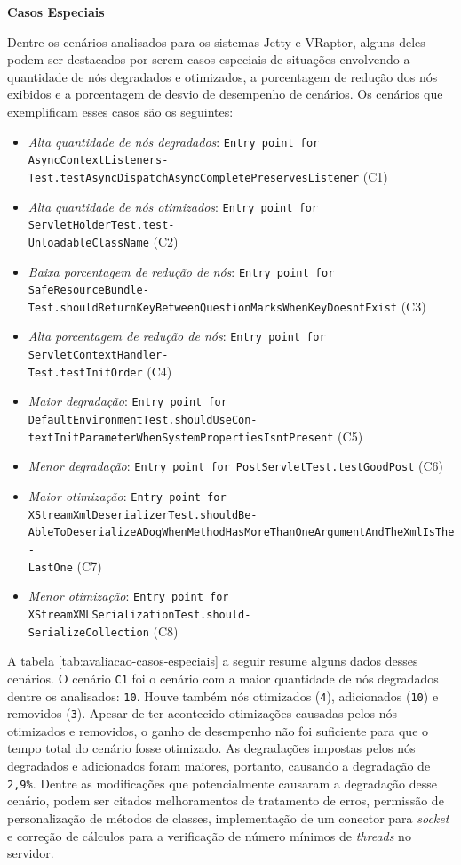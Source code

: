 \noindent \textbf{Casos Especiais}

Dentre os cenários analisados para os sistemas Jetty e VRaptor, alguns deles podem ser destacados por serem casos especiais de situações envolvendo a quantidade de nós degradados e otimizados, a porcentagem de redução dos nós exibidos e a porcentagem de desvio de desempenho de cenários. Os cenários que exemplificam esses casos são os seguintes:
\begin{itemize}
  \item \textit{Alta quantidade de nós degradados}: \texttt{Entry point for AsyncContextListeners-\\Test.testAsyncDispatchAsyncCompletePreservesListener} (C1)
  \item \textit{Alta quantidade de nós otimizados}:  \texttt{Entry point for ServletHolderTest.test-\\UnloadableClassName} (C2)
  \item \textit{Baixa porcentagem de redução de nós}: \texttt{Entry point for SafeResourceBundle-\\Test.shouldReturnKeyBetweenQuestionMarksWhenKeyDoesntExist} (C3)
  \item \textit{Alta porcentagem de redução de nós}: \texttt{Entry point for ServletContextHandler-\\Test.testInitOrder} (C4)
  \item \textit{Maior degradação}: \texttt{Entry point for DefaultEnvironmentTest.shouldUseCon-\\textInitParameterWhenSystemPropertiesIsntPresent} (C5)
  \item \textit{Menor degradação}: \texttt{Entry point for PostServletTest.testGoodPost} (C6)
  \item \textit{Maior otimização}: \texttt{Entry point for XStreamXmlDeserializerTest.shouldBe-\\AbleToDeserializeADogWhenMethodHasMoreThanOneArgumentAndTheXmlIsThe-\\LastOne} (C7)
  \item \textit{Menor otimização}: \texttt{Entry point for XStreamXMLSerializationTest.should-\\SerializeCollection} (C8)
\end{itemize}

A tabela \ref{tab:avaliacao-casos-especiais} a seguir resume alguns dados desses cenários. O cenário \texttt{C1} foi o cenário com a maior quantidade de nós degradados dentre os analisados: \texttt{10}. Houve também nós otimizados (\texttt{4}), adicionados (\texttt{10}) e removidos (\texttt{3}). Apesar de ter acontecido otimizações causadas pelos nós otimizados e removidos, o ganho de desempenho não foi suficiente para que o tempo total do cenário fosse otimizado. As degradações impostas pelos nós degradados e adicionados foram maiores, portanto, causando a degradação de \texttt{2,9\%}. Dentre as modificações que potencialmente causaram a degradação desse cenário, podem ser citados melhoramentos de tratamento de erros, permissão de personalização de métodos de classes, implementação de um conector para \textit{socket} e correção de cálculos para a verificação de número mínimos de \textit{threads} no servidor.


